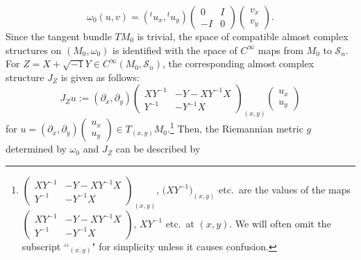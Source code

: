 \documentclass[10pt,a4paper]{amsart}
\numberwithin{equation}{section}
\begin{document}
\begin{equation*}\label{omega}
\omega_0(u,v)=\left({}^tu_x, {}^tu_y\right)
\begin{pmatrix}
0 & I \\
-I & 0
\end{pmatrix}
\begin{pmatrix}
v_x\\
v_y
\end{pmatrix}.
\end{equation*}
Since the tangent bundle $TM_0$ is trivial, the space of compatible almost complex structures on $(M_0,\omega_0)$ is identified with the space of $C^\infty$ maps from $M_0$ to ${\mathcal S}_n$. For $Z=X+\sqrt{-1}Y\in C^\infty ( M_0,{\mathcal S}_n)$, the corresponding almost complex structure $J_Z$ is given as follows:
\begin{equation}\label{J}
J_Zu:=(\partial_x, \partial_y)
\begin{pmatrix}
XY^{-1} & -Y-XY^{-1}X \\
Y^{-1} & -Y^{-1}X
\end{pmatrix}_{(x,y)}
\begin{pmatrix}
u_x \\
u_y
\end{pmatrix}
\end{equation}
for $u=(\partial_x, \partial_y)
\left(\begin{smallmatrix}
u_x \\
u_y
\end{smallmatrix}\right)\in T_{(x,y)}M_0$.\footnote{
$\left(\begin{smallmatrix}
XY^{-1} & -Y-XY^{-1}X \\
Y^{-1} & -Y^{-1}X
\end{smallmatrix}\right)_{(x,y)}$, $\bigl(XY^{-1}\bigr)_{(x,y)}$ etc.\
are the values of the maps
$\left(\begin{smallmatrix}
XY^{-1} & -Y-XY^{-1}X \\
Y^{-1} & -Y^{-1}X
\end{smallmatrix}\right)$, $XY^{-1}$ etc.\
at $(x,y)$. We will often omit the subscript \lq\lq${}_{(x,y)}$" for simplicity unless it causes confusion.} Then, the Riemannian metric $g$ determined by $\omega_0$ and $J_Z$ can be described by
\end{document}
